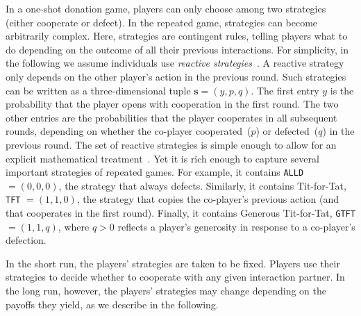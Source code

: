 \documentclass[11pt]{article}
\def\alld{\texttt{ALLD}}
\def\tft{\texttt{TFT}}
\def\gtft{\texttt{GTFT}}
\theoremstyle{plainCl1}
\theoremstyle{plainCl2}
\begin{document}

In a one-shot donation game, players can only choose among two strategies (either cooperate or defect).
In the repeated game, strategies can become arbitrarily complex. 
Here, strategies are contingent rules, telling players what to do depending on the outcome of all their previous interactions. 
For simplicity, in the following we assume individuals use {\it reactive strategies}~\citep{Nowak1992tit}. 
A reactive strategy only depends on the other player's action in the previous round. 
Such strategies can be written as a three-dimensional tuple \(\mathbf{s}=(y, p,q)\). 
The first entry \(y\) is the probability that the player opens with cooperation in the first round. 
The two other entries are the probabilities that the player cooperates in all subsequent rounds, depending on whether the co-player cooperated~($p$) or defected~($q$) in the previous round. 
The set of reactive strategies is simple enough to allow for an explicit mathematical treatment~\citep{hofbauer1998evolutionary}. 
Yet it is rich enough to capture several important strategies of repeated games. 
For example, it contains \alld{} $=\!(0,0,0)$, the strategy that always defects. 
Similarly, it contains Tit-for-Tat, \tft{} $=\!(1,1,0)$, the strategy that copies the co-player's previous action (and that cooperates in the first round). 
Finally, it contains Generous Tit-for-Tat, \gtft $=\!(1,1,q)$, where $q\!>\!0$ reflects a player's generosity in response to a co-player's defection.  

In the short run, the players' strategies are taken to be fixed.
Players use their strategies to decide whether to cooperate with any given interaction partner. 
In the long run, however, the players' strategies may change depending on the payoffs they yield, as we describe in the following.\\
 
\end{document}
